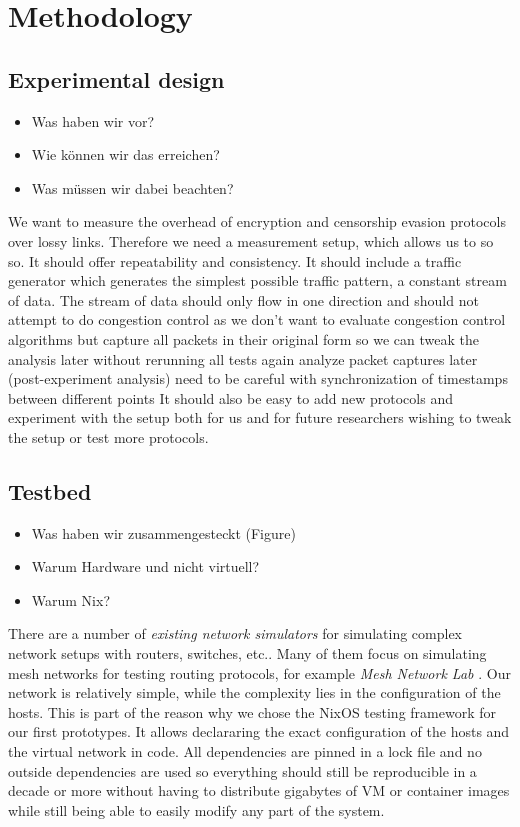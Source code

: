 
\chapter{Methodology}
\label{chap:methodology}

\section{Experimental design}
\begin{itemize}
	\item Was haben wir vor?
	\item Wie können wir das erreichen?
	\item Was müssen wir dabei beachten?
\end{itemize}
We want to measure the overhead of encryption and censorship evasion protocols over lossy links.
Therefore we need a measurement setup, which allows us to so so.
It should offer repeatability and consistency.
It should include a traffic generator which generates the simplest possible traffic pattern, a constant stream of data.
The stream of data should only flow in one direction and should not attempt to do congestion control as we don't want to evaluate congestion control algorithms but 
capture all packets in their original form so we can tweak the analysis later without rerunning all tests again
analyze packet captures later (post-experiment analysis)
need to be careful with synchronization of timestamps between different points
It should also be easy to add new protocols and experiment with the setup both for us and for future researchers wishing to tweak the setup or test more protocols.

\section{Testbed}
\begin{itemize}
  \item Was haben wir zusammengesteckt (Figure)
  \item Warum Hardware und nicht virtuell?
  \item Warum Nix?
\end{itemize}
There are a number of \textit{existing network simulators} \cite{network-simulators-list} for simulating complex network setups with routers, switches, etc..
Many of them focus on simulating mesh networks for testing routing protocols, for example \textit{Mesh Network Lab} \cite{meshnet-lab}.
Our network is relatively simple, while the complexity lies in the configuration of the hosts.
This is part of the reason why we chose the NixOS testing framework for our first prototypes.
It allows declararing the exact configuration of the hosts and the virtual network in code.
All dependencies are pinned in a lock file and no outside dependencies are used so everything should still be reproducible in a decade or more without having to distribute gigabytes of VM or container images while still being able to easily modify any part of the system.

